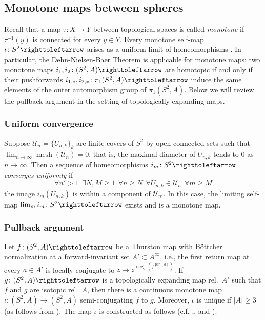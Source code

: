 \documentclass{amsart}
\theoremstyle{plain}
\theoremstyle{definition}
\theoremstyle{remark}
\newcommand{\reminder}[1]{\textsl{$\lhd\rhd$#1$\lhd\rhd$}\marginpar{$\lhd\rhd\lhd\rhd\lhd\rhd$}}%
\newcommand{\hide}[1]{}
\renewcommand{\sp}{{\ \ }}
\newcommand{\per}{{\operatorname{per}}}
\newcommand{\UU}{{\mathcal U}}
\newcommand\selfmap{\righttoleftarrow}
\newcommand{\mesh}{{\operatorname{mesh}}}
\begin{document}
 
\subsection{Monotone maps between spheres} %
Recall that a map $\tau \colon X\to Y$ between topological spaces is called \emph{monotone} if $\tau^{-1}(y)$ is connected for every $y\in Y$. Every monotone self-map $\iota\colon S^2\selfmap$ arises as a uniform limit of homeomorphisms \cite{MonotoneMaps}.  In particular, the Dehn-Nielsen-Baer Theorem is applicable for monotone maps: two monotone maps $i_1,i_2\colon (S^2,A)\selfmap$ are homotopic if and only if their pushforwards $i_{1,*},i_{2,*}\colon \pi_1(S^2,A)\selfmap$ induce the same elements of the outer automorphism group of $\pi_1(S^2,A)$. Below we will review the pullback argument in the setting of topologically expanding maps.


\subsubsection{Uniform convergence} Suppose $\UU_n = \{U_{n,k}\}_k$ are finite covers of $S^2$ by open connected sets such that $\lim_{n\to\infty}\mesh(\UU_n)=0$, that is,  the maximal diameter of $U_{n,k}$ tends to $0$ as $n\to \infty$. 
Then a sequence of homeomorphisms $i_m\colon S^2\selfmap$ \emph{converges uniformly} if
\[ \forall n'>1\sp \exists N, M \ge 1 \sp \forall n\ge N\sp  \forall U_{n,k}\in \UU_n\sp \forall m\ge M\]
the image $i_m(U_{n,k})$ is within a component of $\UU_{n'}$. In this case, the limiting self-map $\lim _m i_m\colon S^2\selfmap$ exists and is a monotone map.

\subsubsection{Pullback argument}  
\label{sss:PullbackArg:S^2}
Let $f\colon(S^2,A)\selfmap$ be a Thurston map with B\"ottcher normalization at a forward-invariant set $A'\subset A^\infty$, i.e.,  the first return map at every $a\in A'$ is locally conjugate to $z\mapsto z^{\deg_a(f^{\per(a)})}$. If $g \colon(S^2,A)\selfmap$ is a topologically expanding map rel.\ $A'$ such that $f$ and $g$ are isotopic rel.\ $A$, then there is a continuous monotone map $\iota\colon (S^2,A)\to (S^2,A)$ semi-conjugating $f$ to $g$.  Moreover, $\iota$ is unique if $|A|\ge 3$ (as follows from \cite[Corollary 4.30]{BD_III}).  The map $\iota$ is constructed as follows %
(c.f. \cite{IshiiSmillie},\cite[Section 11.1]{THEBook}, and \cite[Section 4.5]{BD_Exp}).
\end{document}
